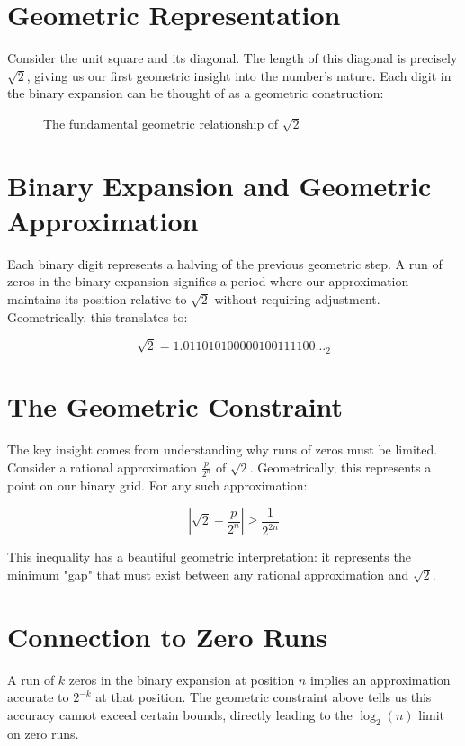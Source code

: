 \section{Geometric Representation}
Consider the unit square and its diagonal. The length of this diagonal is precisely $\sqrt{2}$, giving us our first geometric insight into the number's nature. Each digit in the binary expansion can be thought of as a geometric construction:

\begin{figure}[H]
\centering
{}
\caption{The fundamental geometric relationship of $\sqrt{2}$}
\end{figure}

\section{Binary Expansion and Geometric Approximation}
Each binary digit represents a halving of the previous geometric step. A run of zeros in the binary expansion signifies a period where our approximation maintains its position relative to $\sqrt{2}$ without requiring adjustment. Geometrically, this translates to:

$$\sqrt{2} = 1.011010100000100111100\ldots_2$$

\section{The Geometric Constraint}
The key insight comes from understanding why runs of zeros must be limited. Consider a rational approximation $\frac{p}{2^n}$ of $\sqrt{2}$. Geometrically, this represents a point on our binary grid. For any such approximation:

$$\left|\sqrt{2} - \frac{p}{2^n}\right| \geq \frac{1}{2^{2n}}$$

This inequality has a beautiful geometric interpretation: it represents the minimum "gap" that must exist between any rational approximation and $\sqrt{2}$.

\section{Connection to Zero Runs}
A run of $k$ zeros in the binary expansion at position $n$ implies an approximation accurate to $2^{-k}$ at that position. The geometric constraint above tells us this accuracy cannot exceed certain bounds, directly leading to the $\log_2(n)$ limit on zero runs.

